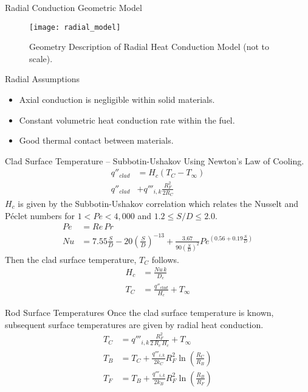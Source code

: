\begin{frame}{Radial Conduction Geometric Model}
  \begin{figure}
    \centering
    \texttt{[image: radial\_model]}
    \caption{Geometry Description of Radial Heat Conduction Model (not to
      scale).}
    \label{fig:radial_model}
  \end{figure}
\end{frame}

\begin{frame}{Radial Assumptions}
  \begin{itemize}
    \item Axial conduction is negligible within solid materials.
    \item Constant volumetric heat conduction rate within the fuel.
    \item Good thermal contact between materials.
  \end{itemize}
\end{frame}

\begin{frame}{Clad Surface Temperature -- Subbotin-Ushakov}
  Using Newton's Law of Cooling.
  \begin{align}
    q''_{clad} &= H_c (T_C - T_{\infty}) \\
    q''_{clad} &+ q'''_{i,k} \frac{R_F^2}{2 R_C}
  \end{align}
  $H_c$ is given by the Subbotin-Ushakov correlation \cite{subbotinUshakov}
  which relates the Nusselt and P\'eclet numbers for ${1 < Pe < 4,000}$ and 
  ${ 1.2 \le S/D \le 2.0 }$.
  \begin{align}
    Pe &= Re \, Pr \\
    \label{eq:subbotinUshakov}
    Nu &= 7.55 \frac{S}{D} - 20 \left(\frac{S}{D}\right)^{-13} + 
      \frac{3.67}{90\left(\frac{S}{D}\right)^{2}}
      Pe^{\left(0.56 + 0.19 \frac{S}{D}\right)}
  \end{align}
  Then the clad surface temperature, $T_C$ follows.
  \begin{align}
    H_c &= \frac{N\!u \, k}{D_e} \\
    T_C &= \frac{q''_{clad}}{H_c} + T_{\infty}
  \end{align}
\end{frame}

\begin{frame}{Rod Surface Temperatures}
  Once the clad surface temperature is known, subsequent surface temperatures
  are given by radial heat conduction.
  \begin{align}
    \label{eq:tc_forward}
    T_C &= q'''_{i,k} \frac{R_F^2}{2\,R_c\,H_c} + T_{\infty} \\
    \label{eq:tb_forward}
    T_B &= T_C + \frac{q'''_{i,k}}{2 k_C} R_F^2
      \ln\left(\frac{R_C}{R_B}\right) \\
    \label{eq:tf_forward}
    T_F &= T_B + \frac{q'''_{i,k}}{2 k_B} R_F^2 
      \ln\left(\frac{R_B}{R_F}\right) \\
  \end{align}
\end{frame}

